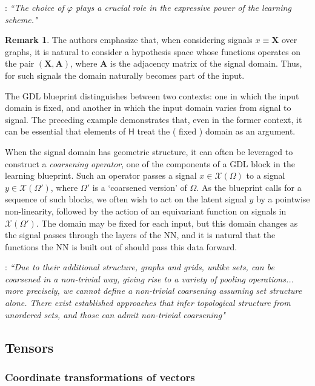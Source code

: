 \documentclass[12pt]{article}
\numberwithin{equation}{section}
\theoremstyle{definition}
\newtheorem{rmk}[thm]{Remark}
\newcommand{		\cX		}	{	\mathcal{X}				}
\newcommand{		\Oh		}	{	\Omega					}
\newcommand{		\1		}	{	\bm{1}					}%
\begin{document}
\vspace{5mm}

\subitem \cite{BBCV21} : \emph{``The choice of $\varphi$ plays a crucial role in the expressive power of the learning scheme."}


\begin{rmk} The authors \cite{BBCV21} emphasize that, when considering signals $x \equiv \bm{X}$ over graphs, it is natural to consider a hypothesis space whose functions operates on the pair $( \bm{X}, \bm{A})$, where $\bm{A}$ is the adjacency matrix of the signal domain. Thus, for such signals the domain naturally becomes part of the input. 

The GDL blueprint distinguishes between two contexts: one in which the input domain is fixed, and another in which the input domain varies from signal to signal. The preceding example demonstrates that, even in the former context, it can be essential that elements of $\textsf{H}$ treat the ( fixed ) domain as an argument. 

When the signal domain has geometric structure, it can often be leveraged to construct a \emph{coarsening operator}, one of the components of a GDL block in the learning blueprint. Such an operator passes a signal $x \in \cX(\Oh)$ to a signal $y \in \cX( \Oh')$, where $\Oh'$ is a `coarsened version' of $\Oh$. As the blueprint calls for a sequence of such blocks, we often wish to act on the latent signal $y$ by a pointwise non-linearity, followed by the action of an equivariant function on signals in $\cX( \Oh')$. The domain may be fixed for each input, but this domain changes as the signal passes through the layers of the NN, and it is natural that the functions the NN is built out of should pass this data forward. 

\subitem \cite{BBCV21} : \emph{``Due to their additional structure, graphs and grids, unlike sets, can be coarsened in a non-trivial way, giving rise to a variety of pooling operations... more precisely, we cannot define a non-trivial coarsening assuming set structure alone. There exist established approaches that infer topological structure from unordered sets, and those can admit non-trivial coarsening"}


\end{rmk}

\subsection{Tensors}

\subsubsection*{Coordinate transformations of vectors}
\end{document}
